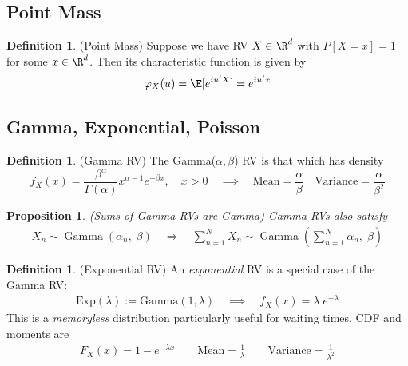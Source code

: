\documentclass[12pt]{article}
\theoremstyle{plain}
\newtheorem{prop}[thm]{Proposition}
\theoremstyle{definition}
\newtheorem{defn}[thm]{Definition}
\theoremstyle{remark}
\newcommand{\sumnN}{\sum^N_{n=1}}
\begin{document}
\subsection{Point Mass}

\begin{defn}(Point Mass)
Suppose we have RV $X\in\R^d$ with $P[X=x]=1$ for some $x\in\R^d$.
Then its characteristic function is given by
\begin{align*}
  \varphi_X(u)
  = \E[e^{iu'X}] = e^{iu'x}
\end{align*}
\end{defn}


\subsection{Gamma, Exponential, Poisson}

\begin{defn}(Gamma RV)
The Gamma($\alpha,\beta$) RV is that which has density
\begin{equation}
   f_X(x) = \frac{\beta^\alpha}{\Gamma(\alpha)} x^{\alpha-1}
    e^{-\beta x}, \quad x > 0
    \quad\implies\quad
    \text{Mean} = \frac{\alpha}{\beta}
    \quad
    \text{Variance} = \frac{\alpha}{\beta^2}
\end{equation}
\end{defn}

\begin{prop}\emph{(Sums of Gamma RVs are Gamma)}
Gamma RVs also satisfy
\begin{align*}
  X_n \sim \operatorname{Gamma}(\alpha_n, \;\beta)
  \quad \Rightarrow \quad
   \sumnN X_n \sim
   \operatorname{Gamma}\left(\sumnN \alpha_n,\;\beta \right)
\end{align*}
\end{prop}

\begin{defn}(Exponential RV)
An \emph{exponential} RV is a special case of the Gamma RV:
\begin{align*}
  \text{Exp}(\lambda)
  :=
  \text{Gamma}(1,\lambda)
  \quad\implies\quad
  f_X(x) = \lambda\; e^{-\lambda}
\end{align*}
This is a \emph{memoryless} distribution particularly useful for
waiting times.
CDF and moments are
\begin{align*}
  F_X(x)
  = 1 - e^{-\lambda x}
  \qquad
  \text{Mean} = \frac{1}{\lambda}
  \qquad
  \text{Variance} = \frac{1}{\lambda^2}
\end{align*}
\end{defn}
\end{document}
